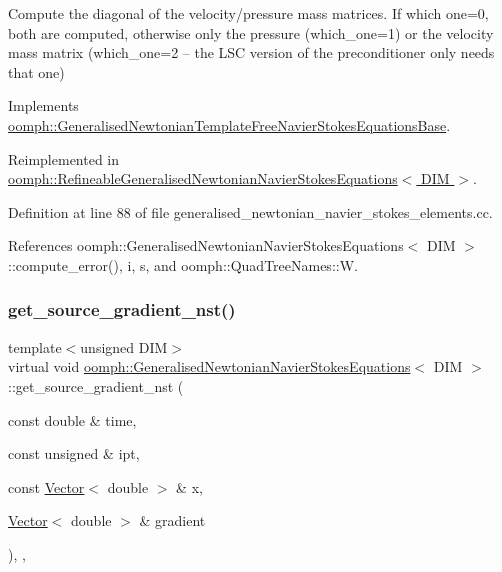 Compute the diagonal of the velocity/pressure mass matrices. If which one=0, both are computed, otherwise only the pressure (which\+\_\+one=1) or the velocity mass matrix (which\+\_\+one=2 -- the L\+SC version of the preconditioner only needs that one) 

Implements \hyperlink{classoomph_1_1GeneralisedNewtonianTemplateFreeNavierStokesEquationsBase_a04ab7221559a058af6f0266197094320}{oomph\+::\+Generalised\+Newtonian\+Template\+Free\+Navier\+Stokes\+Equations\+Base}.



Reimplemented in \hyperlink{classoomph_1_1RefineableGeneralisedNewtonianNavierStokesEquations_af66689b596908f67bf4af1ad9d6c11eb}{oomph\+::\+Refineable\+Generalised\+Newtonian\+Navier\+Stokes\+Equations$<$ D\+I\+M $>$}.



Definition at line 88 of file generalised\+\_\+newtonian\+\_\+navier\+\_\+stokes\+\_\+elements.\+cc.



References oomph\+::\+Generalised\+Newtonian\+Navier\+Stokes\+Equations$<$ D\+I\+M $>$\+::compute\+\_\+error(), i, s, and oomph\+::\+Quad\+Tree\+Names\+::W.

\mbox{\label{classoomph_1_1GeneralisedNewtonianNavierStokesEquations_ac3e66e5ca9d23b4ef96a32064bae84b9}} 
\subsubsection{\texorpdfstring{get\+\_\+source\+\_\+gradient\+\_\+nst()}{get\_source\_gradient\_nst()}}
{\footnotesize\ttfamily template$<$unsigned D\+IM$>$ \\
virtual void \hyperlink{classoomph_1_1GeneralisedNewtonianNavierStokesEquations}{oomph\+::\+Generalised\+Newtonian\+Navier\+Stokes\+Equations}$<$ D\+IM $>$\+::get\+\_\+source\+\_\+gradient\+\_\+nst (\begin{DoxyParamCaption}\item[{const double \&}]{time,  }\item[{const unsigned \&}]{ipt,  }\item[{const \hyperlink{classoomph_1_1Vector}{Vector}$<$ double $>$ \&}]{x,  }\item[{\hyperlink{classoomph_1_1Vector}{Vector}$<$ double $>$ \&}]{gradient }\end{DoxyParamCaption})\hspace{0.3cm}{\ttfamily [inline]}, {\ttfamily [protected]}, {\ttfamily [virtual]}}

